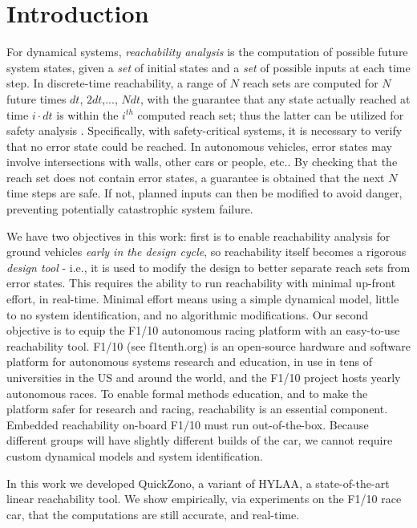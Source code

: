 \documentclass[runningheads]{llncs}
\begin{document}
\section{Introduction}
For dynamical systems, \textit{reachability analysis} is the computation of possible future system states, given a \textit{set} of initial states and a \textit{set} of possible inputs at each time step. 
In discrete-time reachability, a range of $N$ reach sets are computed for $N$ future times $dt$, $2dt$,..., $Ndt$, with the guarantee that any state actually reached at time $i\cdot dt$ is within the $i^{th}$ computed reach set; thus the latter can be utilized for safety analysis \cite{malerintro}.
Specifically, with safety-critical systems, it is necessary to verify that no error state could be reached. In autonomous vehicles, error states may involve intersections with walls, other cars or people, etc.. By checking that the reach set does not contain error states, a guarantee is obtained that the next $N$ time steps are safe.  
If not, planned inputs can then be modified to avoid danger, preventing potentially catastrophic system failure. 

We have two objectives in this work: first is to enable reachability analysis for ground vehicles \textit{early in the design cycle}, so reachability itself becomes a rigorous \textit{design tool} - i.e., it is used to modify the design to better separate reach sets from error states.
This requires the ability to run reachability with minimal up-front effort, in real-time.
Minimal effort means using a simple dynamical model, little to no system identification, and no algorithmic modifications. 
Our second objective is to equip the F1/10 autonomous racing platform with an easy-to-use reachability tool. 
F1/10 (see f1tenth.org) is an open-source hardware and software platform for autonomous systems research and education, in use in tens of universities in the US and around the world, and the F1/10 project hosts yearly autonomous races. 
To enable formal methods education, and to make the platform safer for research and racing, reachability is an essential component. 
Embedded reachability on-board F1/10 must run out-of-the-box. Because different groups will have slightly different builds of the car, we cannot require custom dynamical models and system identification.

In this work we developed QuickZono, a variant of HYLAA\cite{hylaa}, a state-of-the-art linear reachability tool.
We show empirically, via experiments on the F1/10 race car, that the computations are still accurate, and real-time. 
\end{document}
